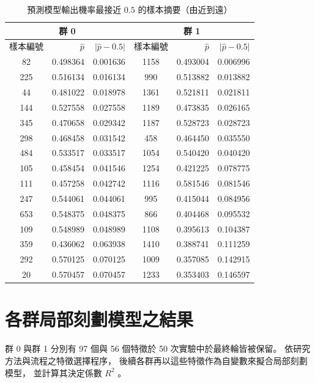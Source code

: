\documentclass[12pt,a4paper,oneside]{book}
\begin{document}
	\begin{table}[H]
		\centering
		\caption{預測模型輸出機率最接近 $0.5$ 的樣本摘要（由近到遠）}
		\vspace{0.15cm}
		\label{tab:接近0.5}
			\begin{tabular}{crr|crr}
				\hline
				\multicolumn{3}{c|}{群 0} & \multicolumn{3}{c}{群 1} \\
				\hline
				樣本編號 & $\hat{p}$ & $\lvert \hat{p}-0.5\rvert$ &
				樣本編號 & $\hat{p}$ & $\lvert \hat{p}-0.5\rvert$ \\
				\hline
				82  & 0.498364 & 0.001636 & 1158 & 0.493004 & 0.006996 \\
				225 & 0.516134 & 0.016134 & 990  & 0.513882 & 0.013882 \\
				44  & 0.481022 & 0.018978 & 1361 & 0.521811 & 0.021811 \\
				144 & 0.527558 & 0.027558 & 1189 & 0.473835 & 0.026165 \\
				345 & 0.470658 & 0.029342 & 1187 & 0.528723 & 0.028723 \\
				298 & 0.468458 & 0.031542 & 458  & 0.464450 & 0.035550 \\
				484 & 0.533517 & 0.033517 & 1054 & 0.540420 & 0.040420 \\
				105 & 0.458454 & 0.041546 & 1254 & 0.421225 & 0.078775 \\
				111 & 0.457258 & 0.042742 & 1116 & 0.581546 & 0.081546 \\
				247 & 0.544061 & 0.044061 & 995  & 0.415044 & 0.084956 \\
				653 & 0.548375 & 0.048375 & 866  & 0.404468 & 0.095532 \\
				109 & 0.548989 & 0.048989 & 1108 & 0.395613 & 0.104387 \\
				359 & 0.436062 & 0.063938 & 1410 & 0.388741 & 0.111259 \\
				292 & 0.570125 & 0.070125 & 1009 & 0.357085 & 0.142915 \\
				20  & 0.570457 & 0.070457 & 1233 & 0.353403 & 0.146597 \\
				\hline
			\end{tabular}
	\end{table}

	\section{各群局部刻劃模型之結果}

	群 0 與群 1 分別有 97 個與 56 個特徵於 50 次實驗中於最終輪皆被保留。
	依研究方法與流程之特徵選擇程序，
	後續各群再以這些特徵作為自變數來擬合局部刻劃模型，
	並計算其決定係數 $R^2$ 。
\end{document}
